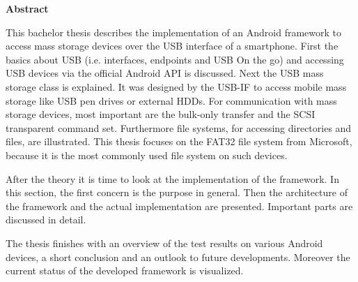

\clearemptydoublepage
{}
{}	





\vspace*{2cm}
\begin{center}
{\Large \bf Abstract}
\end{center}
\vspace{1cm}

This bachelor thesis describes the implementation of an Android framework to access mass storage devices over the USB interface of a smartphone. First the basics about USB (i.e. interfaces, endpoints and USB On the go) and accessing USB devices via the official Android API is discussed. Next the USB mass storage class is explained. It was designed by the USB-IF to access mobile mass storage like USB pen drives or external HDDs. For communication with mass storage devices, most important are the bulk-only transfer and the SCSI transparent command set. Furthermore file systems, for accessing directories and files, are illustrated. This thesis focuses on the FAT32 file system from Microsoft, because it is the most commonly used file system on such devices.

After the theory it is time to look at the implementation of the framework. In this section, the first concern is the purpose in general. Then the architecture of the framework and the actual implementation are presented. Important parts are discussed in detail.

The thesis finishes with an overview of the test results on various Android devices, a short conclusion and an outlook to future developments. Moreover the current status of the developed framework is visualized. 